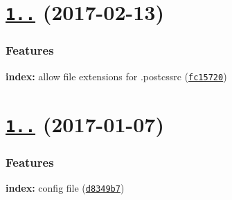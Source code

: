 \label{_1.2.0}%
 \section*{\href{https://github.com/michael-ciniawsky/postcss-load-options/compare/v1.1.0...v1.2.0}{\tt 1..} (2017-\/02-\/13)}

\subsubsection*{Features}


\begin{DoxyItemize}
\item {\bfseries index\+:} allow file extensions for .postcssrc (\href{https://github.com/michael-ciniawsky/postcss-load-options/commit/fc15720}{\tt fc15720})
\end{DoxyItemize}

\label{_1.1.0}%
 \section*{\href{https://github.com/michael-ciniawsky/postcss-load-options/compare/v1.0.2...v1.1.0}{\tt 1..} (2017-\/01-\/07)}

\subsubsection*{Features}


\begin{DoxyItemize}
\item {\bfseries index\+:} config file (\href{https://github.com/michael-ciniawsky/postcss-load-options/commit/d8349b7}{\tt d8349b7}) 
\end{DoxyItemize}
